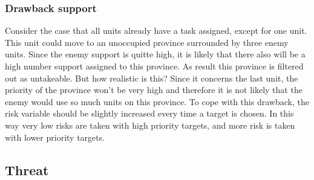 \documentclass[a4paper]{article} %
\begin{document}
\begin{description}
\subsubsection{Drawback support}
Consider the case that all units already have a task assigned, except for one unit. This unit could move to an unoccupied province surrounded by three enemy units. Since the enemy support is quitte high, it is likely that there also will be a high number support assigned to this province. As result this province is filtered out as untakeable. But how realistic is this? Since it concerns the last unit, the priority of the province won't be very high and therefore it is not likely that the enemy would use so much units on this province. To cope with this drawback, the risk variable should be slightly increased every time a target is chosen. In this way very low risks are taken with high priority targets, and more risk is taken with lower priority targets. 

\subsection{Threat}

\subsection{}



\end{description} 





{}
\end{document}
